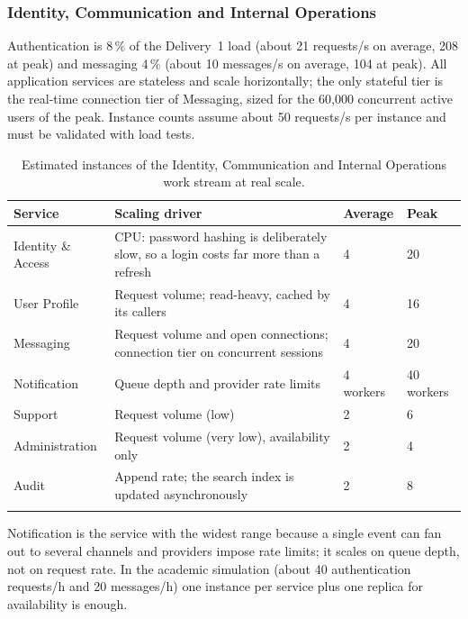 \begingroup
\setlength{\emergencystretch}{3em}
\subsubsection{Identity, Communication and Internal Operations}
\label{sec:id-scaling}

Authentication is 8\,\% of the Delivery~1 load (about 21 requests/s on average,
208 at peak) and messaging 4\,\% (about 10 messages/s on average, 104 at peak).
All application services are stateless and scale horizontally; the only
stateful tier is the real-time connection tier of Messaging, sized for the
60,000 concurrent active users of the peak. Instance counts assume about
50 requests/s per instance and must be validated with load tests.

\begin{longtable}{@{}L{3.3cm}L{6.4cm}L{2.0cm}L{2.0cm}@{}}
\toprule
\textbf{Service} & \textbf{Scaling driver} & \textbf{Average} & \textbf{Peak} \\
\midrule
\endhead
Identity \& Access & CPU: password hashing is deliberately slow, so a
  login costs far more than a refresh & 4 & 20 \\
User Profile & Request volume; read-heavy, cached by its callers & 4 & 16 \\
Messaging & Request volume and open connections; connection tier on
  concurrent sessions & 4 & 20 \\
Notification & Queue depth and provider rate limits & 4 workers & 40 workers \\
Support & Request volume (low) & 2 & 6 \\
Administration & Request volume (very low), availability only & 2 & 4 \\
Audit & Append rate; the search index is updated asynchronously & 2 & 8 \\
\bottomrule
\caption{Estimated instances of the Identity, Communication and Internal
Operations work stream at real scale.}
\label{tab:id-scaling}
\end{longtable}

Notification is the service with the widest range because a single event can
fan out to several channels and providers impose rate limits; it scales on
queue depth, not on request rate. In the academic simulation (about 40
authentication requests/h and 20 messages/h) one instance per service plus
one replica for availability is enough.
\endgroup

